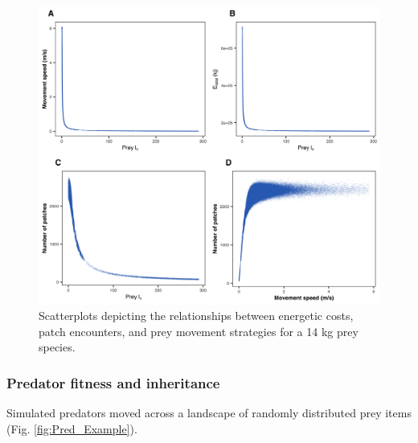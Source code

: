 \documentclass[12pt]{article}
\begin{document}
\begin{figure}[!h]
\centering
\includegraphics[scale=1]{Prey_Diagnostics.png}
\caption{Scatterplots depicting the relationships between energetic costs, patch encounters, and prey movement strategies for a 14 kg prey species.}
\label{fig:Prey_Diagnostics}
\end{figure}


\subsubsection*{Predator fitness and inheritance}

Simulated predators moved across a landscape of randomly distributed prey items (Fig. \ref{fig:Pred_Example}).
\end{document}
